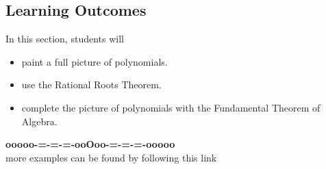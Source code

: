 \documentclass{ximera}
\begin{document}
\subsection*{Learning Outcomes}

\begin{sectionOutcomes}
In this section, students will 

\begin{itemize}
\item paint a full picture of polynomials.
\item use the Rational Roots Theorem.
\item complete the picture of polynomials with the Fundamental Theorem of Algebra.
\end{itemize}
\end{sectionOutcomes}










\begin{center}
\textbf{\textcolor{green!50!black}{ooooo-=-=-=-ooOoo-=-=-=-ooooo}} \\

more examples can be found by following this link\\ 

\end{center}
\end{document}
